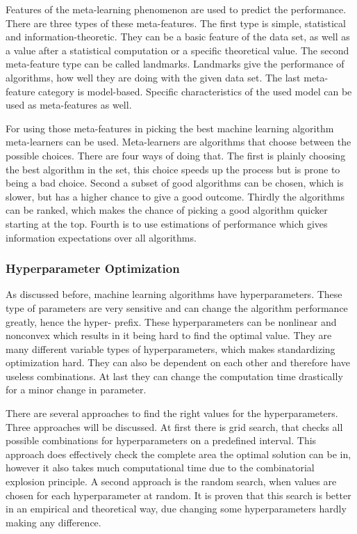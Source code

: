 \documentclass[10pt,a4paper]{article}
\begin{document}
	Features of the meta-learning phenomenon are used to predict the performance. There are three types of these meta-features. The first type is simple, statistical and information-theoretic. They can be a basic feature of the data set, as well as a value after a statistical computation or a specific theoretical value. The second meta-feature type can be called landmarks. Landmarks give the performance of algorithms, how well they are doing with the given data set. The last meta-feature category is model-based. Specific characteristics of the used model can be used as meta-features as well.\cite{brazdil1994characterizing, vilalta2004using}

	For using those meta-features in picking the best machine learning algorithm meta-learners can be used. Meta-learners are algorithms that choose between the possible choices. There are four ways of doing that. The first is plainly choosing the best algorithm in the set, this choice speeds up the process but is prone to being a bad choice. Second a subset of good algorithms can be chosen, which is slower, but has a higher chance to give a good outcome. Thirdly the algorithms can be ranked, which makes the chance of picking a good algorithm quicker starting at the top. Fourth is to use estimations of performance which gives information expectations over all algorithms.\cite{brazdil2009development}

	\subsubsection{Hyperparameter Optimization}
	\label{subsubsec:Hyperparameter optimization}

	As discussed before, machine learning algorithms have hyperparameters. These type of parameters are very sensitive and can change the algorithm performance greatly, hence the hyper- prefix. These hyperparameters can be nonlinear and nonconvex which results in it being hard to find the optimal value. They are many different variable types of hyperparameters, which makes standardizing optimization hard. They can also be dependent on each other and therefore have useless combinations. At last they can change the computation time drastically for a minor change in parameter.\cite{claesen2015hyperparameter}

	There are several approaches to find the right values for the hyperparameters. Three approaches will be discussed. At first there is grid search, that checks all possible combinations for hyperparameters on a predefined interval. This approach does effectively check the complete area the optimal solution can be in, however it also takes much computational time due to the combinatorial explosion principle.\cite{hsu2003practical} A second approach is the random search, when values are chosen for each hyperparameter at random. It is proven that this search is better in an empirical and theoretical way, due changing some hyperparameters hardly making any difference.\cite{bergstra2012random} 
	
\end{document}
